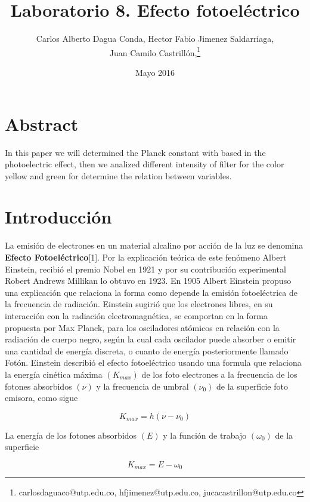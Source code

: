 \documentclass{article}
\title{Laboratorio 8. Efecto fotoeléctrico}
\author{Carlos Alberto Dagua Conda, Hector Fabio Jimenez Saldarriaga, \\Juan Camilo
Castrillón,\thanks{carlosdaguaco@utp.edu.co, hfjimenez@utp.edu.co, jucacastrillon@utp.edu.co} }
\date{Mayo 2016}
\begin{document}
\maketitle

\section{Abstract}

In this paper we will determined the Planck constant with based in the photoelectric effect, then we analized different intensity of filter for the color yellow and green for determine the relation between variables.

\section{Introducción}

La emisión de electrones en un material alcalino por acción de la luz se denomina \textbf{Efecto Fotoeléctrico}[1]. Por la explicación teórica de este fenómeno Albert Einstein,
recibió el premio Nobel en 1921 y por su contribución experimental Robert Andrews Millikan lo obtuvo en 1923.\newline
En 1905 Albert Einstein propuso una explicación que relaciona la forma como depende la emisión fotoeléctrica de la frecuencia de radiación. Einstein sugirió que los electrones libres, en su interacción con la radiación electromagnética, se comportan en la forma propuesta por Max Planck, para los osciladores atómicos en relación con la radiación de cuerpo negro, según la cual cada oscilador puede absorber o emitir una cantidad de energía discreta, o cuanto de energía posteriormente llamado Fotón.\newline
Einstein describió el efecto fotoeléctrico usando una formula que relaciona la energía cinética máxima $(K_{max})$ de los foto electrones a la frecuencia de los fotones absorbidos $(\nu)$ y la frecuencia de umbral $(\nu_{0})$ de la superficie foto emisora, como sigue

\begin{equation}
    K_{max}=h(\nu-\nu_{0})
\end{equation}

La energía de los fotones absorbidos $(E)$ y la función de trabajo $(\omega_{0})$ de la superficie

\begin{equation}
    K_{max}=E-\omega_{0}
\end{equation}
\end{document}
